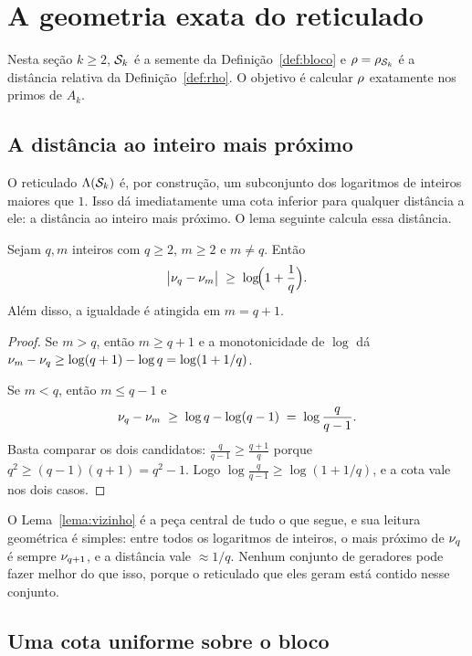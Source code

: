 \section{A geometria exata do reticulado}\label{sec:geometria}

Nesta seção $k\ge2$, $\mathcal{S}_k$ é a semente da Definição~\ref{def:bloco} e
$\rho=\rho_{\mathcal{S}_k}$ é a distância relativa da Definição~\ref{def:rho}. O objetivo
é calcular $\rho$ exatamente nos primos de $A_k$.

\subsection{A distância ao inteiro mais próximo}

O reticulado $\Lambda(\mathcal{S}_k)$ é, por construção, um subconjunto dos logaritmos de
inteiros maiores que $1$. Isso dá imediatamente uma cota inferior para qualquer
distância a ele: a distância ao inteiro mais próximo. O lema seguinte calcula essa
distância.

\begin{lema}\label{lema:vizinho}
Sejam $q,m$ inteiros com $q\ge2$, $m\ge2$ e $m\neq q$. Então
\[
  \bigl|\nu_{q}-\nu_{m}\bigr| \;\ge\; \log\!\Bigl(1+\frac1q\Bigr).
\]
Além disso, a igualdade é atingida em $m=q+1$.
\end{lema}

\begin{proof}
Se $m>q$, então $m\ge q+1$ e a monotonicidade de $\log$ dá
$\nu_{m}-\nu_{q}\ge\log(q+1)-\log q=\log(1+1/q)$.

Se $m<q$, então $m\le q-1$ e
\[
  \nu_{q}-\nu_{m} \;\ge\; \log q-\log(q-1) \;=\; \log\frac{q}{q-1}.
\]
Basta comparar os dois candidatos: $\frac{q}{q-1}\ge\frac{q+1}{q}$ porque
$q^2\ge (q-1)(q+1)=q^2-1$. Logo $\log\frac{q}{q-1}\ge\log(1+1/q)$, e a cota vale
nos dois casos.
\end{proof}

O Lema~\ref{lema:vizinho} é a peça central de tudo o que segue, e sua leitura
geométrica é simples: entre todos os logaritmos de inteiros, o mais próximo de
$\nu_{q}$ é sempre $\nu_{q+1}$, e a distância vale $\approx 1/q$. Nenhum
conjunto de geradores pode fazer melhor do que isso, porque o reticulado que eles
geram está contido nesse conjunto.

\subsection{Uma cota uniforme sobre o bloco}

